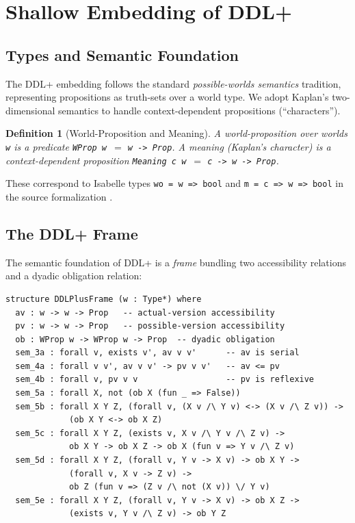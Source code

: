 \documentclass[]{article}
\newtheorem{definition}[theorem]{Definition}
\newcommand{\code}[1]{\texttt{#1}}
\newcommand{\DDL}{\textup{DDL+}}
\begin{document}
\section{Shallow Embedding of DDL+}
\label{sec:ddl}

\subsection{Types and Semantic Foundation}

The \DDL{} embedding follows the standard \emph{possible-worlds semantics}
tradition, representing propositions as truth-sets over a world type.
We adopt Kaplan's two-dimensional semantics \cite{Kaplan1989} to handle
context-dependent propositions (``characters'').

\begin{definition}[World-Proposition and Meaning]
A \emph{world-proposition} over worlds \code{w} is a predicate
\code{WProp w}~$=$ \code{w -> Prop}.
A \emph{meaning} (Kaplan's character) is a context-dependent proposition
\code{Meaning c w}~$=$ \code{c -> w -> Prop}.
\end{definition}

These correspond to Isabelle types \texttt{wo = w => bool} and
\texttt{m = c => w => bool} in the source formalization \cite{Benzmuller2018}.

\subsection{The DDL+ Frame}

The semantic foundation of \DDL{} is a \emph{frame} bundling two accessibility
relations and a dyadic obligation relation:

\begin{lstlisting}
structure DDLPlusFrame (w : Type*) where
  av : w -> w -> Prop   -- actual-version accessibility
  pv : w -> w -> Prop   -- possible-version accessibility
  ob : WProp w -> WProp w -> Prop  -- dyadic obligation
  sem_3a : forall v, exists v', av v v'      -- av is serial
  sem_4a : forall v v', av v v' -> pv v v'   -- av <= pv
  sem_4b : forall v, pv v v                  -- pv is reflexive
  sem_5a : forall X, not (ob X (fun _ => False))
  sem_5b : forall X Y Z, (forall v, (X v /\ Y v) <-> (X v /\ Z v)) ->
             (ob X Y <-> ob X Z)
  sem_5c : forall X Y Z, (exists v, X v /\ Y v /\ Z v) ->
             ob X Y -> ob X Z -> ob X (fun v => Y v /\ Z v)
  sem_5d : forall X Y Z, (forall v, Y v -> X v) -> ob X Y ->
             (forall v, X v -> Z v) ->
             ob Z (fun v => (Z v /\ not (X v)) \/ Y v)
  sem_5e : forall X Y Z, (forall v, Y v -> X v) -> ob X Z ->
             (exists v, Y v /\ Z v) -> ob Y Z
\end{lstlisting}
\end{document}

